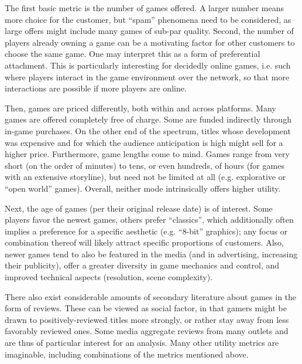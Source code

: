 The first basic metric is the number of games offered. A larger number
means more choice for the customer, but ``spam'' phenomena need to
be considered, as large offers might include many games of sub-par quality.
Second, the number of players already owning a game can be a
motivating factor for other customers to choose the same game.
One may interpret this as a form of preferential attachment.
This is particularly interesting for decidedly online games, i.e.
such where players interact in the game environment over the network,
so that more interactions are possible if more players are online.

Then, games are priced differently, both within and across
platforms. Many games are offered completely free of charge.
Some are funded indirectly through in-game purchases. On the
other end of the spectrum, titles whose development was expensive
and for which the audience anticipation is high might sell
for a higher price. Furthermore, game lengths come to mind.
Games range from very short (on the order of minutes) to tens, or even
hundreds, of hours (for games with an extensive storyline),
but need not be limited at all (e.g. explorative or ``open world'' games).
Overall, neither mode intrinsically offers higher utility.

Next, the age of games (per their original release date) is of
interest. Some players favor the newest games, others prefer ``classics'', 
which additionally often implies a preference for a specific aesthetic (e.g.
``8-bit'' graphics); any focus or combination thereof will likely attract
specific proportions of customers. Also, newer games tend to also be featured
in the media (and in advertising, increasing their publicity),
offer a greater diversity in game mechanics and control,
and improved technical aspects (resolution, scene complexity).

There also exist considerable amounts of secondary literature about
games in the form of reviews. These can be viewed as social factor,
in that gamers might be drawn to positively-reviewed titles more
strongly, or rather stay away from less favorably reviewed ones.
Some media aggregate reviews from many outlets and
are thus of particular interest for an analysis. Many other utility
metrics are imaginable, including combinations of the metrics mentioned above.

